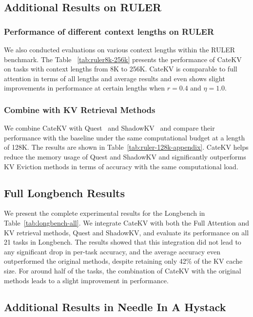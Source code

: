 \subsection{Additional Results on RULER}
\label{appendix-ruler}
\subsubsection{Performance of different context lengths on RULER}
We also conducted evaluations on various context lengths within the RULER benchmark. The Table ~\ref{tab:ruler8k-256k} presents the performance of CateKV on tasks with context lengths from 8K to 256K. CateKV is comparable to full attention in terms of all lengths and average results and even shows slight improvements in performance at certain lengths when $r=0.4$ and $\eta=1.0$.


\subsubsection{Combine with KV Retrieval Methods}
We combine CateKV with Quest~\cite{quest} and ShadowKV~\cite{shadowkv} and compare their performance with the baseline under the same computational budget at a length of 128K. The results are shown in Table~\ref{tab:ruler-128k-appendix}. CateKV helps reduce the memory usage of Quest and ShadowKV and significantly outperforms KV Eviction methods in terms of accuracy with the same computational load.


\subsection{Full Longbench Results}
\label{appendix-longbench}
We present the complete experimental results for the Longbench in Table~\ref{tab:longbench-all}. We integrate CateKV with both the Full Attention and KV retrieval methods, Quest\cite{quest} and ShadowKV\cite{shadowkv}, and evaluate its performance on all 21 tasks in Longbench. The results showed that this integration did not lead to any significant drop in per-task accuracy, and the average accuracy even outperformed the original methods, despite retaining only 42\% of the KV cache size. For around half of the tasks, the combination of CateKV with the original methods leads to a slight improvement in performance.



\subsection{Additional Results in Needle In A Hystack}
\label{appendix-niah}

